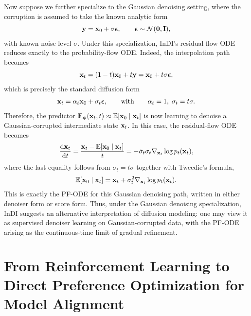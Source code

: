 Now suppose we further specialize to the Gaussian denoising setting, where the corruption is assumed to take the known analytic form
\[
{\mathbf{y}}={\mathbf{x}}_0+\sigma{\bm{\epsilon}},
\qquad {\bm{\epsilon}}\sim\mathcal N(\bm 0,{\mathbf{I}}),
\]
with known noise level \(\sigma\). Under this specialization, InDI's residual-flow ODE reduces exactly to the probability-flow ODE. Indeed, the interpolation path becomes
\[
{\mathbf{x}}_t=(1-t){\mathbf{x}}_0+t{\mathbf{y}}
=
{\mathbf{x}}_0+t\sigma{\bm{\epsilon}},
\]
which is precisely the standard diffusion form
\[
{\mathbf{x}}_t=\alpha_t{\mathbf{x}}_0+\sigma_t{\bm{\epsilon}},
\qquad\text{with}\qquad
\alpha_t=1,\;\sigma_t=t\sigma.
\]
Therefore, the predictor \({\mathbf{F}}_{{\bm{\phi}}}({\mathbf{x}}_t,t)\approx \mathbb E[{\mathbf{x}}_0\mid {\mathbf{x}}_t]\) is now learning to denoise a Gaussian-corrupted intermediate state \({\mathbf{x}}_t\). In this case, the residual-flow ODE becomes
\[
\frac{\mathop{}\!\mathrm{d} {\mathbf{x}}_t}{\mathop{}\!\mathrm{d} t}
=
\frac{{\mathbf{x}}_t-\mathbb E[{\mathbf{x}}_0\mid {\mathbf{x}}_t]}{t}
=
-\dot{\sigma}_t\sigma_t\nabla_{{\mathbf{x}}_t}\log p_t({\mathbf{x}}_t),
\]
where the last equality follows from \(\sigma_t=t\sigma\) together with Tweedie's formula,
\[
\mathbb E[{\mathbf{x}}_0\mid {\mathbf{x}}_t]
=
{\mathbf{x}}_t+\sigma_t^2\nabla_{{\mathbf{x}}_t}\log p_t({\mathbf{x}}_t).
\]
This is exactly the PF-ODE for this Gaussian denoising path, written in either denoiser form or score form. Thus, under the Gaussian denoising specialization, InDI suggests an alternative interpretation of diffusion modeling: one may view it as supervised denoiser learning on Gaussian-corrupted data, with the PF-ODE arising as the continuous-time limit of gradual refinement.



\newpage
\section{From Reinforcement Learning to Direct Preference Optimization for Model Alignment}\label{sec:rlhf-dpo}



